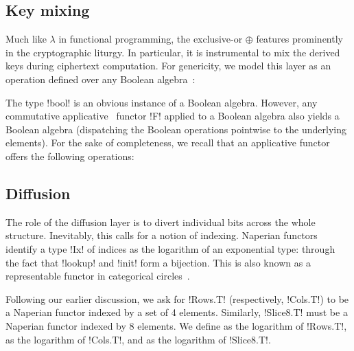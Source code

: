 \documentclass[draft,english]{jflart}
\begin{document}
\subsection{Key mixing}


Much like $\lambda$ in functional programming, the exclusive-or
$\oplus$ features prominently in the cryptographic liturgy. In
particular, it is instrumental to mix the derived keys during
ciphertext computation. For genericity, we model this layer as an
operation defined over any Boolean
algebra~\citep{givant:boolean-algebras}:
%


The type \coqe!bool! is an obvious instance of a Boolean algebra.
However, any commutative applicative~\citep{mcbride:applicative}
functor \coqe!F! applied to a Boolean algebra also yields a Boolean
algebra (dispatching the Boolean operations pointwise to the
underlying elements). For the sake of completeness, we recall that an
applicative functor offers the following operations:
%


\subsection{Diffusion}


The role of the diffusion layer is to divert individual bits across the
whole structure. Inevitably, this calls for a notion of indexing.
Naperian functors~\citep{hancock:napierian} identify a type \coqe!Ix! of
indices as the logarithm of an exponential type:
%
%
through the fact that \coqe!lookup! and \coqe!init! form a bijection.
This is also known as a representable functor in categorical
circles~\citep{maclane:working-categorist}.


Following our earlier discussion, we ask for \coqe!Rows.T!
(respectively, \coqe!Cols.T!) to be a Naperian functor indexed by a
set of 4 elements. Similarly, \coqe!Slice8.T! must be a Naperian
functor indexed by 8 elements. We define
%
%
as the logarithm of \coqe!Rows.T!,
%
%
as the logarithm of \coqe!Cols.T!, and
%
%
as the logarithm of \coqe!Slice8.T!.
\end{document}
